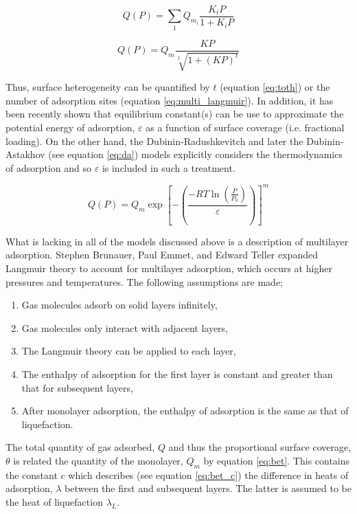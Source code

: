 \begin{equation}\label{eq:multi_langmuir}
    Q(P) = \sum_{1} Q_{m_i} \frac{K_i P}{1 + K_i P}
\end{equation}

\begin{equation}\label{eq:toth}
    Q(P) = Q_m \frac{K P}{\sqrt[t]{1 + (K P)^t}}
\end{equation}

Thus, surface heterogeneity can be quantified by $t$ (equation \ref{eq:toth}) or the number of adsorption sites (equation \ref{eq:multi_langmuir}). In addition, it has been recently shown that equilibrium constant(s) can be use to approximate the potential energy of adsorption, $\varepsilon$ as a function of surface coverage (i.e. fractional loading).\citep{whittaker2013predicting} On the other hand, the  Dubinin-Radushkevitch and later the Dubinin-Astakhov (see equation \ref{eq:da}) models explicitly considers the thermodynamics of adsorption and so $\varepsilon$ is included in such a treatment.

\begin{equation}\label{eq:da}
    Q(P) = Q_m \exp{ \left[ - \left( \frac{ -R T \ln{\left( \frac{P}{P_0}\right)}}{\varepsilon} \right) \right]^m }
\end{equation}

What is lacking in all of the models discussed above is a description of multilayer adsorption. Stephen Brunauer, Paul Emmet, and Edward Teller expanded Langmuir theory to account for multilayer \gls{adsorption}, which occurs at higher pressures and temperatures. The following assumptions are made;\citep{Brunauer1938Adsorption}

	\begin{enumerate}[label=(\arabic*)]
		\item Gas molecules adsorb on solid layers infinitely,
		\item Gas molecules only interact with adjacent layers,
		\item The Langmuir theory can be applied to each layer,
		\item The enthalpy of \gls{adsorption} for the first layer is constant and greater than that for subsequent layers,
		\item After monolayer \gls{adsorption}, the enthalpy of \gls{adsorption} is the same as that of liquefaction.
	\end{enumerate}

The total quantity of gas adsorbed, $Q$  and thus the proportional surface coverage, $\theta$ is related the quantity of the monolayer, $Q_m$ by equation \ref{eq:bet}. This contains the constant $c$ which describes (see equation \ref{eq:bet_c}) the difference in heats of adsorption, $\lambda$ between the first and subsequent layers. The latter is assumed to be the heat of liquefaction $\lambda_L$.

